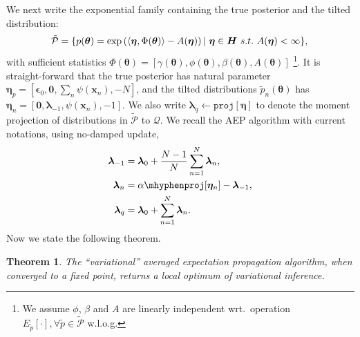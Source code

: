 \documentclass{article} %
\newtheorem{theorem}{Theorem}
\begin{document}
We next write the exponential family containing the true posterior and the tilted distribution:
\begin{equation}
\mathcal{\tilde{P}} = \{p(\bm{\theta}) = \exp \left( \langle \bm{\eta}, \Phi(\bm{\theta}) \rangle - A(\bm{\eta}) \right) |\ \bm{\eta} \in \bm{H} \ s.t.~ A(\bm{\eta}) < \infty \}, \\
\end{equation}
with sufficient statistics $\Phi(\bm{\theta}) = [\gamma(\bm{\theta}), \phi(\bm{\theta}), \beta(\bm{\theta}), A(\bm{\theta})]$ \footnote{We assume $\phi$, $\beta$ and $A$ are linearly independent wrt.~operation $E_{\tilde{p}}[\cdot], \forall \tilde{p} \in \tilde{\mathcal{P}}$ w.l.o.g.}. It is straight-forward that the true posterior has natural parameter $\bm{\eta}_p = [\bm{\epsilon}_0, \bm{0},\sum_{n} \psi(\bm{x}_n), -N]$, and the tilted distributions $\tilde{p}_n(\bm{\theta})$ has $\bm{\eta}_n = [\bm{0}, \bm{\lambda}_{-1}, \psi(\bm{x}_n), -1]$. We also write $\bm{\lambda}_q \leftarrow \mathtt{proj}[\bm{\eta}]$ to denote the moment projection of distributions in $\mathcal{\tilde{P}}$ to $\mathcal{Q}$.
%
We recall the AEP algorithm with current notations, using no-damped update,
%
\begin{align}
\bm{\lambda}_{-1} & = \bm{\lambda}_0 + \frac{N-1}{N} \sum_{n=1}^N \bm{\lambda}_n, \\
\bm{\lambda}_n &= \mathtt{\alpha \mhyphen proj}[\bm{\eta}_n] - \bm{\lambda}_{-1}, \\
\bm{\lambda}_q &= \bm{\lambda}_0 + \sum_{n=1}^N \bm{\lambda}_n.
\end{align}
%
%
Now we state the following theorem. 
%
\begin{theorem}
The ``variational'' averaged expectation propagation algorithm, when converged to a fixed point, returns a local optimum of variational inference.
\end{theorem}
\end{document}
